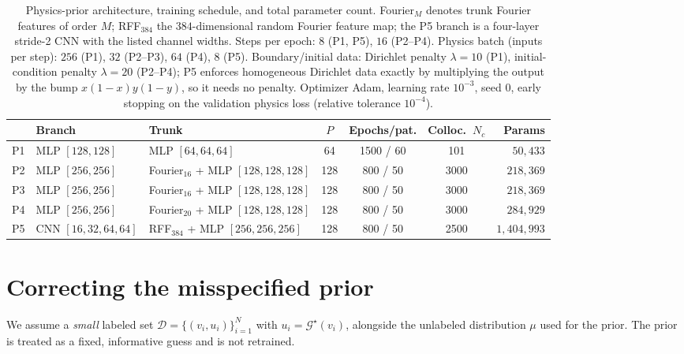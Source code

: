 \documentclass[11pt]{article}
\newcommand{\Gtrue}{\mathcal{G}^{\star}}
\begin{document}
\begin{table}[h]
\centering
\footnotesize
\setlength{\tabcolsep}{5pt}
\begin{tabular}{@{}lllcccr@{}}
\toprule
& Branch & Trunk & $P$ & Epochs/pat. & Colloc.\ $N_c$ & Params \\
\midrule
P1 & MLP $[128,128]$ & MLP $[64,64,64]$ & 64 & 1500 / 60 & 101 & $50{,}433$ \\
P2 & MLP $[256,256]$ & Fourier$_{16}$ + MLP $[128,128,128]$ & 128 & 800 / 50 & 3000 & $218{,}369$ \\
P3 & MLP $[256,256]$ & Fourier$_{16}$ + MLP $[128,128,128]$ & 128 & 800 / 50 & 3000 & $218{,}369$ \\
P4 & MLP $[256,256]$ & Fourier$_{20}$ + MLP $[128,128,128]$ & 128 & 800 / 50 & 3000 & $284{,}929$ \\
P5 & CNN $[16,32,64,64]$ & RFF$_{384}$ + MLP $[256,256,256]$ & 128 & 800 / 50 & 2500 & $1{,}404{,}993$ \\
\bottomrule
\end{tabular}
\caption{Physics-prior architecture, training schedule, and total parameter count. Fourier$_{M}$
denotes trunk Fourier features of order $M$; RFF$_{384}$ the $384$-dimensional random Fourier
feature map; the P5 branch is a four-layer stride-2 CNN with the listed channel widths. Steps per
epoch: $8$ (P1, P5), $16$ (P2--P4). Physics batch (inputs per step): $256$ (P1), $32$ (P2--P3),
$64$ (P4), $8$ (P5). Boundary/initial data: Dirichlet penalty $\lambda{=}10$ (P1), initial-condition
penalty $\lambda{=}20$ (P2--P4); P5 enforces homogeneous Dirichlet data exactly by multiplying the
output by the bump $x(1-x)y(1-y)$, so it needs no penalty. Optimizer Adam, learning rate
$10^{-3}$, seed $0$, early stopping on the validation physics loss (relative tolerance $10^{-4}$).}
\label{tab:prior}
\end{table}

\section{Correcting the misspecified prior}
\label{sec:correct}

We assume a \emph{small} labeled set $\mathcal{D}=\{(v_i,u_i)\}_{i=1}^{N}$ with
$u_i=\Gtrue(v_i)$, alongside the unlabeled distribution $\mu$ used for the prior. The prior is
treated as a fixed, informative guess and is not retrained.
\end{document}
